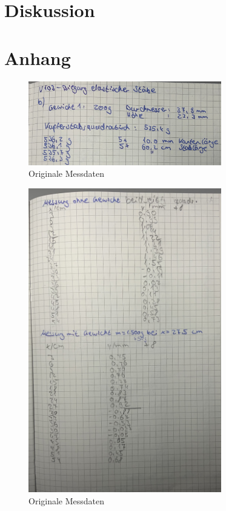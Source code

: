 \section{Diskussion}
\label{sec:Diskussion}



\section{Anhang}
\label{sec:anhang}

\begin{figure}
  \centering
  \includegraphics[width=0.75\textwidth]{Dateien/Bild1.jpeg}
  \caption{Originale Messdaten}
  \label{fig:daten1}
\end{figure}

\begin{figure}
    \centering
    \includegraphics[width=0.75\textwidth]{Dateien/Bild2.jpeg}
    \caption{Originale Messdaten}
    \label{fig:daten2}
\end{figure}

